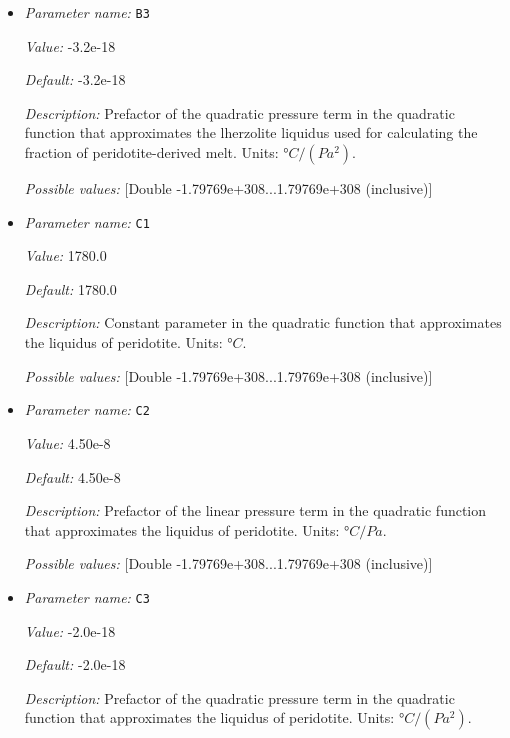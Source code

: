 \begin{itemize}
{\it Default:} 8.0e-8


{\it Description:} Prefactor of the linear pressure term in the quadratic function that approximates the  lherzolite liquidus used for calculating the fraction of peridotite-derived melt. Units: $°C/Pa$.


{\it Possible values:} [Double -1.79769e+308...1.79769e+308 (inclusive)]
\item {\it Parameter name:} {\tt B3}


{\it Value:} -3.2e-18


{\it Default:} -3.2e-18


{\it Description:} Prefactor of the quadratic pressure term in the quadratic function that approximates the  lherzolite liquidus used for calculating the fraction of peridotite-derived melt. Units: $°C/(Pa^2)$.


{\it Possible values:} [Double -1.79769e+308...1.79769e+308 (inclusive)]
\item {\it Parameter name:} {\tt C1}


{\it Value:} 1780.0


{\it Default:} 1780.0


{\it Description:} Constant parameter in the quadratic function that approximates the liquidus of peridotite. Units: $°C$.


{\it Possible values:} [Double -1.79769e+308...1.79769e+308 (inclusive)]
\item {\it Parameter name:} {\tt C2}


{\it Value:} 4.50e-8


{\it Default:} 4.50e-8


{\it Description:} Prefactor of the linear pressure term in the quadratic function that approximates the liquidus of peridotite. Units: $°C/Pa$.


{\it Possible values:} [Double -1.79769e+308...1.79769e+308 (inclusive)]
\item {\it Parameter name:} {\tt C3}


{\it Value:} -2.0e-18


{\it Default:} -2.0e-18


{\it Description:} Prefactor of the quadratic pressure term in the quadratic function that approximates the liquidus of peridotite. Units: $°C/(Pa^2)$.



\end{itemize}

